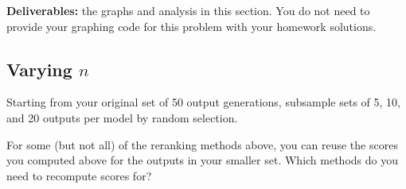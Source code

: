 \documentclass{article}
\begin{document}
\textbf{Deliverables:} the graphs and analysis in this section. You do not need to provide your graphing code for this problem with your homework solutions.

\subsection{Varying $n$}
Starting from your original set of 50 output generations, subsample sets of 5, 10, and 20 outputs per model by random selection.

For some (but not all) of the reranking methods above, you can reuse the scores you computed above for the outputs in your smaller set. Which methods do you need to recompute scores for?
\begin{solve}
    
\end{solve}
\end{document}
